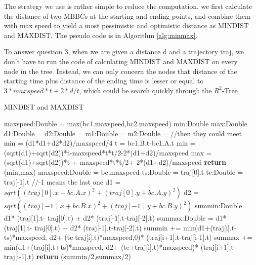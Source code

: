 \documentclass[sigplan]{acmart}
\begin{document}
The strategy we use is rather simple to reduce the computation. we first calculate the distance of two MBBCs at the starting and ending points, and combine them with max speed to yield a most pessimistic and optimistic distance as MINDIST and MAXDIST. The pseudo code is in Algorithm \ref{alg:minmax}.\par
To answer question 3, when we are given a distance d and a trajectory traj, we don't have to run the code of calculating MINDIST and MAXDIST on every node in the tree. Instead, we can only concern the nodes that distance of the starting time plus distance of the ending time is lesser or equal to $3* maxspeed* t + 2*d/t$, which could be search quickly through the $R^2$-Tree
\begin{algorithm}
\caption{MINDIST and MAXDIST} \label{alg:minmax}
\begin{algorithmic}[ht]
    \State maxspeed:Double = max(bc1.maxspeed,bc2.maxspeed)
    \State min:Double
    \State max:Double
    \State d1:Double = 
    \State d2:Double = 
    \State m1:Double = 
    \State m2:Double = 
     //then they could meet
        \State min = (d1*d1+d2*d2)/maxspeed/4
    \Else
        \State t = bc1.B.t-bc1.A.t
        \State min = (sqrt(d1)+sqrt(d2))*t-maxspeed*t*t/2-2*(d1+d2)/maxspeed
    \EndIf
    \State max = (sqrt(d1)+sqrt(d2))*t + maxspeed*t*t/2+ 2*(d1+d2)/maxspeed
    \State \textbf{return} (min,max)
\EndFunction
{}
    \State maxspeed:Double = bc.maxspeed
    \State ts:Double = traj[0].t
    \State te:Double = traj[-1].t //-1 means the last one
    \State d1 = $sqrt((traj[0].x+bc.A.x)^2+(traj[0].y+bc.A.y)^2)$
    \State d2 = $sqrt((traj[-1].x+bc.B.x)^2+(traj[-1].y+bc.B.y)^2)$
    \State summin:Double = d1* (traj[1].t- traj[0].t) + d2* (traj[-1].t-traj[-2].t)
    \State summax:Double = d1* (traj[1].t- traj[0].t) + d2* (traj[-1].t-traj[-2].t)
        \State summin += min(d1+(traj[i].t-ts)*maxspeed, d2+ (te-traj[i].t)*maxspeed,0)* (traj[i+1].t-traj[i-1].t)
        \State summax += min(d1+(traj[i].t+ts)*maxspeed, d2+ (te+traj[i].t)*maxspeed)* (traj[i+1].t-traj[i-1].t)
    \EndFor
    \State \textbf{return} (summin/2,summax/2)
\EndFunction
\end{algorithmic}
\end{algorithm}
\end{document}

